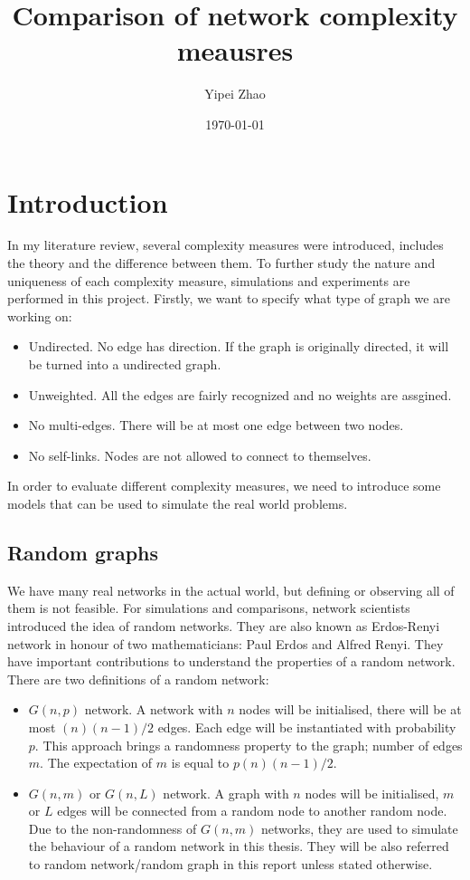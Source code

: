 \documentclass[12pt]{article}
\title{Comparison of network complexity meausres}
\author{Yipei Zhao}
\date{\today}
\begin{document}
\maketitle
\pagebreak

\tableofcontents
\pagebreak
\section{Introduction}
In my literature review, several complexity measures were introduced, includes the theory and the difference between them. To further study the nature and uniqueness of each complexity measure, simulations and experiments are performed in this project. Firstly, we want to specify what type of graph we are working on:
\begin{itemize}
    \item Undirected. No edge has direction. If the graph is originally directed, it will be turned into a undirected graph.
    \item Unweighted. All the edges are fairly recognized and no weights are assgined.
    \item No multi-edges. There will be at most one edge between two nodes.
    \item No self-links. Nodes are not allowed to connect to themselves. 
\end{itemize}
In order to evaluate different complexity measures, we need to introduce some models that can be used to simulate the real world problems.
\subsection{Random graphs}
We have many real networks in the actual world, but defining or observing all of them is not feasible. For simulations and comparisons, network scientists introduced the idea of random networks. They are also known as Erdos-Renyi network in honour of two mathematicians: Paul Erdos and Alfred Renyi. They have important contributions to understand the properties of a random network\cite{barabási2016network}.\\
\noindent
There are two definitions of a random network:
\begin{itemize}
    \item $G(n,p)$ network. A network with $n$ nodes will be initialised, there will be at most $(n)(n-1)/2$ edges. Each edge will be instantiated with probability $p$. This approach brings a randomness property to the graph; number of edges $m$. The expectation of $m$ is equal to $p(n)(n-1)/2$.
    \item $G(n,m)$ or $G(n,L)$ network. A graph with $n$ nodes will be initialised, $m$ or $L$ edges will be connected from a random node to another random node. Due to the non-randomness of $G(n,m)$ networks, they are used to simulate the behaviour of a random network in this thesis. They will be also referred to random network/random graph in this report unless stated otherwise.
\end{itemize}
\end{document}
